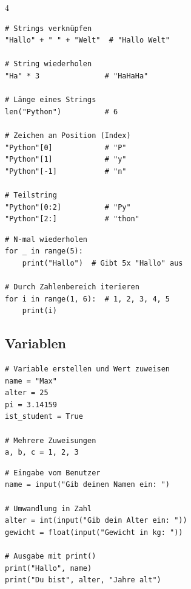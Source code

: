 \begin{landscape}
\begin{multicols*}{4}
		\begin{cheatSheetBox}[title=String-Operationen]
			\begin{lstlisting}
# Strings verknüpfen
"Hallo" + " " + "Welt"  # "Hallo Welt"

# String wiederholen
"Ha" * 3               # "HaHaHa"

# Länge eines Strings
len("Python")          # 6

# Zeichen an Position (Index)
"Python"[0]            # "P"
"Python"[1]            # "y"
"Python"[-1]           # "n"

# Teilstring
"Python"[0:2]          # "Py"
"Python"[2:]           # "thon"
\end{lstlisting}
		\end{cheatSheetBox}

		\begin{cheatSheetBox}[title=Einfache Schleifen mit \lstinline|for|]
			\begin{lstlisting}
# N-mal wiederholen
for _ in range(5):
    print("Hallo")  # Gibt 5x "Hallo" aus

# Durch Zahlenbereich iterieren
for i in range(1, 6):  # 1, 2, 3, 4, 5
    print(i)
\end{lstlisting}
		\end{cheatSheetBox}

		\columnbreak\textcolor{\cheatSheetColor}{\subsection*{Variablen}}

		\begin{cheatSheetBox}[title=Variablen deklarieren]
			\begin{lstlisting}
# Variable erstellen und Wert zuweisen
name = "Max"
alter = 25
pi = 3.14159
ist_student = True

# Mehrere Zuweisungen
a, b, c = 1, 2, 3
\end{lstlisting}
		\end{cheatSheetBox}

		\begin{cheatSheetBox}[title=Eingabe und Ausgabe]
			\begin{lstlisting}
# Eingabe vom Benutzer
name = input("Gib deinen Namen ein: ")

# Umwandlung in Zahl
alter = int(input("Gib dein Alter ein: "))
gewicht = float(input("Gewicht in kg: "))

# Ausgabe mit print()
print("Hallo", name)
print("Du bist", alter, "Jahre alt")


\end{lstlisting}
\end{cheatSheetBox}
\end{multicols*}
\end{landscape}

